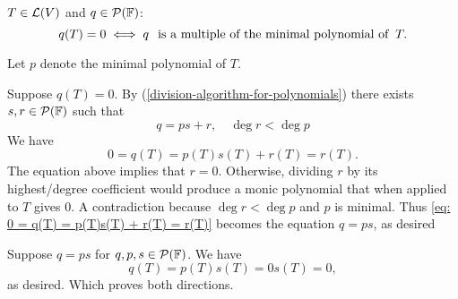 \setcounter{thm}{28}
\begin{thm}
  \label{thm: every zero polynomial is a multiple of the minimal polynomial}
  $T\in \mathcal{L}(V)$ and $q \in \mathcal{P} (\mathbb{F})$:
  \begin{equation}
    q(T)=0 \iff q \;\;\, \text{is a multiple of the minimal polynomial of}\;\; T.
  \end{equation}
\end{thm}
\begin{prf}
  Let $p$ denote the minimal polynomial of $T$.

  \begin{description}

    \item{\Rightarrowdirection}{
      Suppose $q(T)=0$.
      By (\ref{division-algorithm-for-polynomials}) there exists $s,r \in \mathcal{P} (\mathbb{F})$ such that
      \begin{equation}
        q=ps+r, \quad \deg r < \deg p
      \end{equation}
      We have
      \begin{equation}
        \label{eq: 0 = q(T) = p(T)s(T) + r(T) = r(T)}
        0 = q(T) = p(T)s(T) + r(T) = r(T).
      \end{equation}
      The equation above implies that $r=0$. Otherwise, dividing $r$ by its highest\-/degree coefficient would produce a monic polynomial that when applied to $T$ gives $0$. A contradiction because $\deg r < \deg p$ and $p$ is minimal. Thus \eqref{eq: 0 = q(T) = p(T)s(T) + r(T) = r(T)} becomes the equation $q=ps$, as desired
    }
    \item{\Leftarrowdirection}{
      Suppose $q=ps$ for $q,p,s \in \mathcal{P}(\mathbb{F})$. We have
      \begin{equation}
        q(T) = p(T)s(T)=0s(T)=0,
      \end{equation}
      as desired. Which proves both directions.
    }
  \end{description}
   \vspace*{-\baselineskip}
\end{prf}

